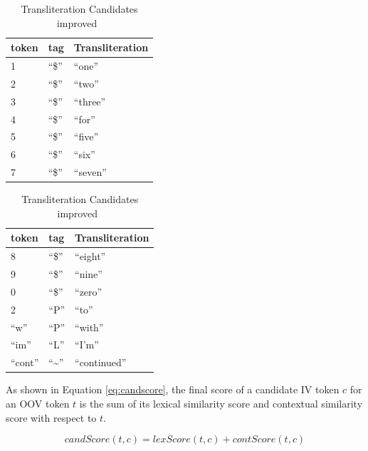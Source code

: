 \documentclass[preprint,review,12pt]{elsarticle}
\begin{document}
\begin{table}[ht]
  \begin{minipage}[c]{0.5\linewidth}
    \begin{tabular}[l]{lll}
    \hline
    token & tag & Transliteration \\
    \hline
    1 & ``\$'' & ``one'' \\
    2 & ``\$'' & ``two'' \\
    3 & ``\$'' & ``three'' \\
    4 & ``\$'' & ``for'' \\
    5 & ``\$'' & ``five'' \\
    6 & ``\$'' & ``six'' \\
    7 & ``\$'' & ``seven'' \\
    \hline
  \end{tabular}
\end{minipage}
  \begin{minipage}[c]{0.5\linewidth}
    \begin{tabular}[l]{lll}
    \hline
    token & tag & Transliteration \\
    \hline
    8 & ``\$'' & ``eight'' \\
    9 & ``\$'' & ``nine'' \\
    0 & ``\$'' & ``zero'' \\
    2 & ``P''  & ``to'' \\
    ``w'' & ``P''  & ``with'' \\
    ``im'' & ``L''  & ``I'm'' \\
    ``cont'' & ``\textasciitilde''  & ``continued'' \\
    \hline
  \end{tabular}
  \end{minipage}
  \caption{Transliteration Candidates improved~\cite{Gouws:2011:CBL:2021109.2021113}}
\label{tab:transliteral}
\end{table}


As shown in Equation \ref{eq:candscore}, the final score of a candidate IV token $c$ for an OOV token $t$ is the sum of its lexical similarity score and contextual similarity score with respect to $t$.

\begin{equation}
candScore(t,c) = lexScore(t,c) + contScore(t,c)
\label{eq:candscore}
\end{equation}
\end{document}
